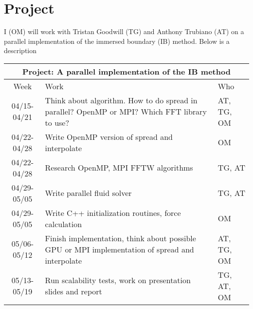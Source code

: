 \documentclass[a4paper]{article}
\begin{document}
\section{Project}
I (OM) will work with Tristan Goodwill (TG) and Anthony Trubiano (AT) on a parallel implementation of the immersed boundary (IB) method. Below is a description

  \begin{center}
  \begin{tabular} {|c|p{9cm}|p{2cm}|}
    \hline
    \multicolumn{3}{|c|}{\bf Project: A parallel implementation of the IB method} \\
    \hline
    Week & Work & Who  \\ \hline \hline
    04/15-04/21 & Think about
    algorithm. How to do spread in parallel? OpenMP or MPI? Which FFT library to use? &  AT, TG, OM \\ \hline
    04/22-04/28 & Write OpenMP version of spread and interpolate & OM \\ \hline
    04/22-04/28 & Research OpenMP, MPI FFTW algorithms & TG, AT \\ \hline
    04/29-05/05 & Write parallel fluid solver & TG, AT \\ \hline
    04/29-05/05 & Write C++ initialization routines, force calculation & OM \\ \hline
    05/06-05/12 & Finish implementation, think about possible GPU or MPI implementation of spread and interpolate & AT, TG, OM \\ \hline
    05/13-05/19 & Run scalability tests, work on
    presentation slides and report  & TG, AT, OM \\ \hline
  \end{tabular}
  \end{center}
\end{document}
